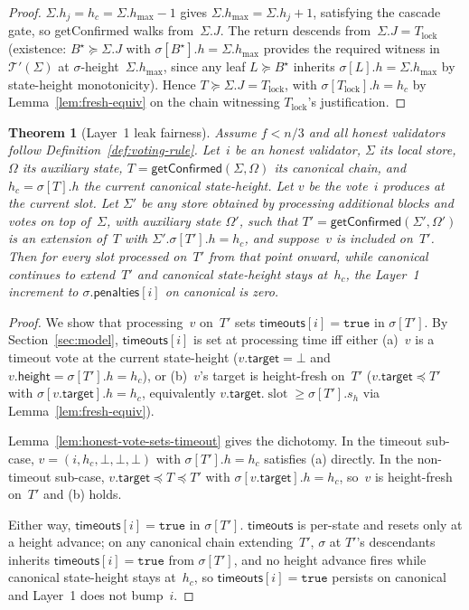 \ifx\litemode\undefined\documentclass{article}\fi
\newcommand{\slot}[0]{\ensuremath{\operatorname{\mathrm{slot}}}}
\newcommand{\target}{\mathsf{target}}
\newcommand{\height}{\mathsf{height}}
\newcommand{\timeouts}{\mathsf{timeouts}}
\newcommand{\penalties}{\mathsf{penalties}}
\newcommand{\hmax}{\ensuremath{h_{\max}}\xspace}
\newcommand{\viableTree}{\ensuremath{\mathcal{T}'}}
\newcommand{\getConfirmed}{\textsf{getConfirmed}\xspace}
\theoremstyle{plain}
\newtheorem{theorem}{Theorem}
\theoremstyle{definition}
\theoremstyle{remark}
\begin{document}
\begin{proof}
$\Sigma.h_j = h_c = \Sigma.\hmax - 1$ gives $\Sigma.\hmax = \Sigma.h_j + 1$, satisfying the cascade gate, so \getConfirmed{} walks from~$\Sigma.J$.
The return descends from~$\Sigma.J = T_{\mathrm{lock}}$ (existence: $B^\star \succeq \Sigma.J$ with $\sigma[B^\star].h = \Sigma.\hmax$ provides the required witness in $\viableTree(\Sigma)$ at $\sigma$-height~$\Sigma.\hmax$, since any leaf $L \succeq B^\star$ inherits $\sigma[L].h = \Sigma.\hmax$ by state-height monotonicity).
Hence $T \succeq \Sigma.J = T_{\mathrm{lock}}$, with $\sigma[T_{\mathrm{lock}}].h = h_c$ by Lemma~\ref{lem:fresh-equiv} on the chain witnessing $T_{\mathrm{lock}}$'s justification.
\end{proof}

\begin{theorem}[Layer~1 leak fairness]\label{thm:fairness}
Assume $f < n/3$ and all honest validators follow Definition~\ref{def:voting-rule}.
Let~$i$ be an honest validator, $\Sigma$ its local store, $\Omega$ its auxiliary state, $T = \getConfirmed(\Sigma, \Omega)$ its canonical chain, and $h_c = \sigma[T].h$ the current canonical state-height.
Let $v$ be the vote~$i$ produces at the current slot.
Let $\Sigma'$ be any store obtained by processing additional blocks and votes on top of~$\Sigma$, with auxiliary state $\Omega'$, such that $T' = \getConfirmed(\Sigma', \Omega')$ is an extension of~$T$ with $\Sigma'.\sigma[T'].h = h_c$, and suppose~$v$ is included on~$T'$.
Then for every slot processed on~$T'$ from that point onward, while canonical continues to extend~$T'$ and canonical state-height stays at~$h_c$, the Layer~1 increment to $\sigma.\penalties[i]$ on canonical is zero.
\end{theorem}

\begin{proof}
We show that processing~$v$ on~$T'$ sets $\timeouts[i] = \mathtt{true}$ in $\sigma[T']$.
By Section~\ref{sec:model}, $\timeouts[i]$ is set at processing time iff either (a)~$v$ is a timeout vote at the current state-height ($v.\target = \bot$ and $v.\height = \sigma[T'].h = h_c$), or (b)~$v$'s target is height-fresh on~$T'$ ($v.\target \preceq T'$ with $\sigma[v.\target].h = h_c$, equivalently $v.\target.\slot \geq \sigma[T'].s_h$ via Lemma~\ref{lem:fresh-equiv}).

Lemma~\ref{lem:honest-vote-sets-timeout} gives the dichotomy.
In the timeout sub-case, $v = (i, h_c, \bot, \bot, \bot)$ with $\sigma[T'].h = h_c$ satisfies (a) directly.
In the non-timeout sub-case, $v.\target \preceq T \preceq T'$ with $\sigma[v.\target].h = h_c$, so~$v$ is height-fresh on~$T'$ and (b) holds.

Either way, $\timeouts[i] = \mathtt{true}$ in $\sigma[T']$.
$\timeouts$ is per-state and resets only at a height advance; on any canonical chain extending~$T'$, $\sigma$ at $T'$'s descendants inherits $\timeouts[i] = \mathtt{true}$ from $\sigma[T']$, and no height advance fires while canonical state-height stays at~$h_c$, so $\timeouts[i] = \mathtt{true}$ persists on canonical and Layer~1 does not bump~$i$.
\end{proof}
\end{document}
